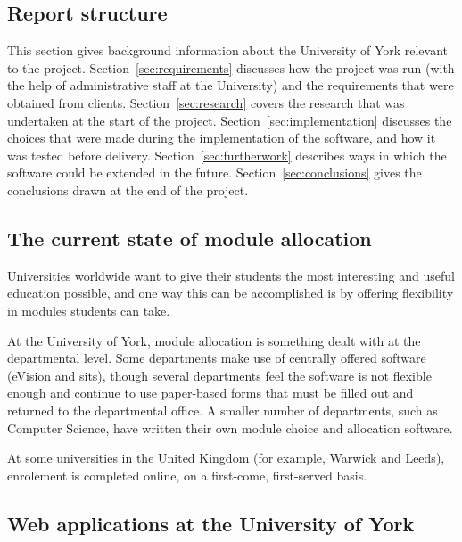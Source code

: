 \documentclass[]{scrartcl}
\begin{document}
\subsection{Report structure}

This section gives background information about the University of York
relevant to the project. Section~\ref{sec:requirements} discusses how the
project was run (with the help of administrative staff at the University) and
the requirements that were obtained from clients. Section~\ref{sec:research}
covers the research that was undertaken at the start of the project.
Section~\ref{sec:implementation} discusses the choices that were made during
the implementation of the software, and how it was tested before delivery.
Section~\ref{sec:furtherwork} describes ways in which the software could be
extended in the future. Section~\ref{sec:conclusions} gives the conclusions
drawn at the end of the project.

\subsection{The current state of module allocation}


Universities worldwide want to give their students the most interesting and
useful education possible, and one way this can be accomplished is by offering
flexibility in modules students can take.

At the University of York, module allocation is something dealt with at the
departmental level. Some departments make use of centrally offered software
(eVision and \gls{sits}), though
several departments feel the software is not flexible enough and continue to
use paper-based forms that must be filled out and returned to the departmental
office. A smaller number of departments, such as Computer Science, have
written their own module choice and allocation software.

At some universities in the United Kingdom (for example, Warwick and Leeds),
enrolement is completed online, on a first-come, first-served basis.


\subsection{Web applications at the University of York}
\end{document}
